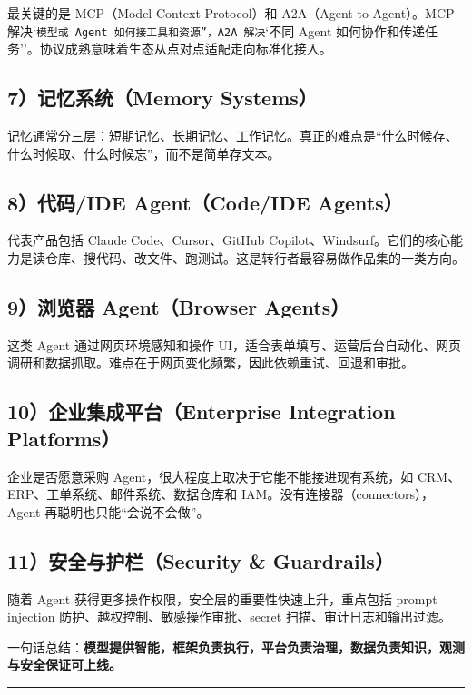 最关键的是 MCP（Model Context Protocol）和 A2A（Agent-to-Agent）。MCP 解决`\texttt{模型或 Agent 如何接工具和资源''，A2A 解决}`不同 Agent 如何协作和传递任务''。协议成熟意味着生态从点对点适配走向标准化接入。


\subsection{7）记忆系统（Memory Systems）}

记忆通常分三层：短期记忆、长期记忆、工作记忆。真正的难点是``什么时候存、什么时候取、什么时候忘''，而不是简单存文本。


\subsection{8）代码/IDE Agent（Code/IDE Agents）}

代表产品包括 Claude Code、Cursor、GitHub Copilot、Windsurf。它们的核心能力是读仓库、搜代码、改文件、跑测试。这是转行者最容易做作品集的一类方向。


\subsection{9）浏览器 Agent（Browser Agents）}

这类 Agent 通过网页环境感知和操作 UI，适合表单填写、运营后台自动化、网页调研和数据抓取。难点在于网页变化频繁，因此依赖重试、回退和审批。


\subsection{10）企业集成平台（Enterprise Integration Platforms）}

企业是否愿意采购 Agent，很大程度上取决于它能不能接进现有系统，如 CRM、ERP、工单系统、邮件系统、数据仓库和 IAM。没有连接器（connectors），Agent 再聪明也只能``会说不会做''。


\subsection{11）安全与护栏（Security \& Guardrails）}

随着 Agent 获得更多操作权限，安全层的重要性快速上升，重点包括 prompt injection 防护、越权控制、敏感操作审批、secret 扫描、审计日志和输出过滤。


一句话总结：\textbf{模型提供智能，框架负责执行，平台负责治理，数据负责知识，观测与安全保证可上线。}


\bigskip\hrule\bigskip

